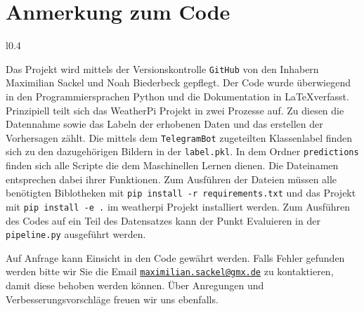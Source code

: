 \newpage
\section{Anmerkung zum Code}
\label{sec:06_code_anhang}
\begin{wrapfigure}{l}{0.4\textwidth}
\vspace{-1.5cm}
\end{wrapfigure}
Das Projekt wird mittels der Versionskontrolle \texttt{GitHub} von den Inhabern
Maximilian Sackel
und Noah Biederbeck gepflegt. 
Der Code wurde überwiegend in den Programmiersprachen Python und die
Dokumentation in \LaTeX verfasst.
Prinzipiell teilt sich das WeatherPi Projekt in zwei Prozesse auf. 
Zu diesen die Datennahme sowie das Labeln der erhobenen Daten und das
erstellen der Vorhersagen zählt.
Die mittels dem \texttt{TelegramBot} zugeteilten Klassenlabel finden sich zu den
dazugehörigen Bildern in der \texttt{label.pkl}.
In dem Ordner \texttt{predictions} finden sich alle Scripte die dem Maschinellen
Lernen dienen.
Die Dateinamen entsprechen dabei ihrer Funktionen.
Zum Ausführen der Dateien müssen alle benötigten Biblotheken mit 
\verb|pip install -r requirements.txt| und das Projekt mit 
\verb|pip install -e .| im weatherpi Projekt installiert werden. 
Zum Ausführen des Codes auf ein Teil des Datensatzes kann der Punkt Evaluieren
in der \texttt{pipeline.py} ausgeführt werden.

Auf Anfrage kann Einsicht in den Code gewährt werden.
Falls Fehler gefunden werden bitte wir Sie die Email
\href{mailto:maximilian.sackel@gmx.de}{\texttt{maximilian.sackel@gmx.de}} zu 
kontaktieren, damit diese behoben werden können.
Über Anregungen und Verbesserungsvorschläge freuen wir uns ebenfalls.
\newpage
